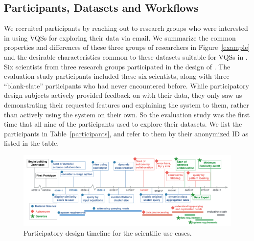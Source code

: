 \subsection{Participants, Datasets and Workflows}
We recruited participants by reaching out to research groups who were interested in using VQSs for exploring their data via email.  We summarize the common properties and differences of these three groups of researchers in Figure~\ref{example} and the desirable characteristics common to these datasets suitable for VQSs in . Six scientists from three research groups participated in the design of \zv. The evaluation study participants included these six scientists, along with three ``blank-slate'' participants who had never encountered \zv before. While participatory design subjects actively provided feedback on \zv with their data, they only saw us demonstrating their requested features and explaining the system to them, rather than actively using the system on their own. So the evaluation study was the first time that all nine of the participants used \zv to explore their datasets. We list the participants in Table~\ref{participants}, and refer to them by their anonymized ID as listed in the table. 
\begin{figure}[ht!]
\centering
\vspace{-10pt}
\includegraphics[width=6in]{figures/timeline_new.pdf}
\vspace{-6pt}\caption{Participatory design timeline for the scientific use cases.}
\label{timeline}
\vspace{-10pt}
\end{figure}

